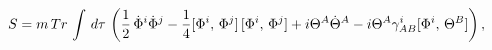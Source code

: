 \begin{equation}\label{5.1}
S={m}\,Tr \, \int\, d\tau\,\left({1\over 2}\,
\dot\Phi^i\dot\Phi^j-{1\over
4}[\Phi^i,\,\Phi^j]\,[\Phi^i,\,\Phi^j]+i\Theta^A\dot\Theta^A-
i\Theta^A\gamma^i_{AB}[\Phi^i,\,\Theta^B] \right),
\end{equation}

